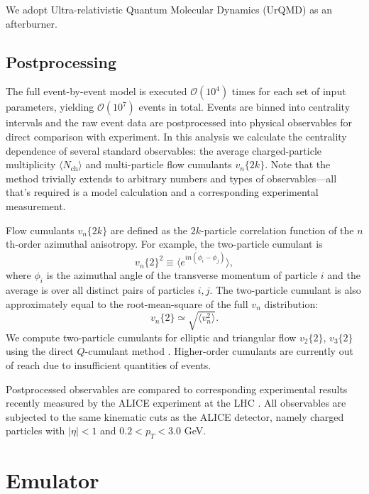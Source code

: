 \documentclass[aps,prc,reprint,superscriptaddress,amsmath]{revtex4-1}
\newcommand{\avg}[1]{\langle #1 \rangle}
\newcommand{\nch}{N_\text{ch}}
\newcommand{\vnk}[2]{v_#1\{#2\}}
\newcommand{\order}[1]{$\mathcal O(10^{#1})$}
\begin{document}
We adopt Ultra-relativistic Quantum Molecular Dynamics (UrQMD) \cite{Bass:1998ca,Bleicher:1999xi} as an afterburner.

\subsection{Postprocessing}

The full event-by-event model is executed \order 4 times for each set of input parameters, yielding \order 7 events in total.
Events are binned into centrality intervals and the raw event data are postprocessed into physical observables for direct comparison with experiment.
In this analysis we calculate the centrality dependence of several standard observables:
the average charged-particle multiplicity $\avg\nch$ and multi-particle flow cumulants $\vnk n {2k}$.
Note that the method trivially extends to arbitrary numbers and types of observables---all that's required is a model calculation and a corresponding experimental measurement.

Flow cumulants $\vnk n {2k}$ are defined as the $2k$-particle correlation function of the $n$th-order azimuthal anisotropy.
For example, the two-particle cumulant is
\begin{equation}
  \vnk n 2^2 \equiv \bigl\langle e^{in(\phi_i - \phi_j)} \bigr\rangle,
\end{equation}
where $\phi_i$ is the azimuthal angle of the transverse momentum of particle $i$ and the average is over all distinct pairs of particles $i,j$.
The two-particle cumulant is also approximately equal to the root-mean-square of the full $v_n$ distribution:
\begin{equation}
  \vnk n 2 \simeq \sqrt{\avg{v_n^2}}.
\end{equation}
We compute two-particle cumulants for elliptic and triangular flow $\vnk 2 2$, $\vnk 3 2$ using the direct $Q$-cumulant method \cite{Bilandzic:2010jr}.
Higher-order cumulants are currently out of reach due to insufficient quantities of events.

Postprocessed observables are compared to corresponding experimental results recently measured by the ALICE experiment at the LHC \cite{Abelev:2014mda}.
All observables are subjected to the same kinematic cuts as the ALICE detector, namely charged particles with $|\eta| < 1$ and $0.2 < p_T < 3.0$ GeV.


\section{Emulator}
\end{document}

